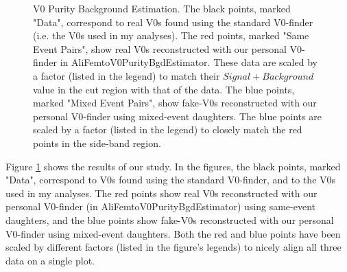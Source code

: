 \documentclass[/home/jesse/Analysis/FemtoAnalysis/AnalysisNotes/AnalysisNoteJBuxton.tex]{subfiles}
\begin{document}
\begin{figure}[h!]
  \centering
  \caption[V0 Purity Background Estimation]{V0 Purity Background Estimation.  The black points, marked "Data", correspond to real V0s found using the standard V0-finder (i.e. the V0s used in my analyses).  The red points, marked "Same Event Pairs", show real V0s reconstructed with our personal V0-finder in AliFemtoV0PurityBgdEstimator.  These data are scaled by a factor (listed in the legend) to match their $Signal+Background$ value in the cut region with that of the data.  The blue points, marked "Mixed Event Pairs", show fake-V0s reconstructed with our personal V0-finder using mixed-event daughters.  The blue points are scaled by a factor (listed in the legend) to closely match the red points in the side-band region.}
  \label{fig:V0PurBgdEst}
\end{figure}

Figure \ref{fig:V0PurBgdEst} shows the results of our study.  In the figures, the black points, marked "Data", correspond to V0s found using the standard V0-finder, and to the V0s used in my analyses.  The red points show real V0s reconstructed with our personal V0-finder (in AliFemtoV0PurityBgdEstimator) using same-event daughters, and the blue points show fake-V0s reconstructed with our personal V0-finder using mixed-event daughters.  Both the red and blue points have been scaled by different factors (listed in the figure's legends) to nicely align all three data on a single plot.
\end{document}
